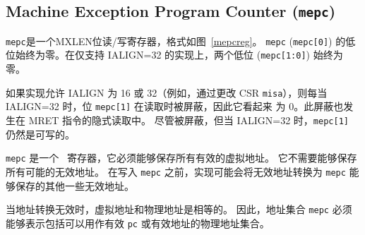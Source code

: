 \subsection{Machine Exception Program Counter ({\tt mepc})}

\iffalse
{\tt mepc} is an MXLEN-bit read/write register formatted as shown in
Figure~\ref{mepcreg}.  The low bit of {\tt mepc} ({\tt mepc[0]}) is
always zero.  On implementations that support only IALIGN=32, the two low bits
({\tt mepc[1:0]}) are always zero.

If an implementation allows IALIGN to be either 16 or 32 (by
changing CSR {\tt misa}, for example), then, whenever IALIGN=32, bit
{\tt mepc[1]} is masked on reads so that it appears to be 0.  This
masking occurs also for the implicit read by the MRET instruction.
Though masked, {\tt mepc[1]} remains writable when IALIGN=32.

{\tt mepc} is a \warl\ register that must be able to hold all valid
virtual addresses.  It need not be capable of holding all possible invalid
addresses.
Prior to writing {\tt mepc}, implementations may convert an invalid address
into some other invalid address that {\tt mepc} is capable of holding.
\fi

{\tt mepc}是一个MXLEN位读/写寄存器，格式如图~\ref{mepcreg}。 {\tt mepc} ({\tt mepc[0]}) 的低位始终为零。在仅支持 IALIGN=32 的实现上，两个低位 ({\tt mepc[1:0]}) 始终为零。

如果实现允许 IALIGN 为 16 或 32（例如，通过更改 CSR {\tt misa}），则每当 IALIGN=32 时，位 {\tt mepc[1]} 在读取时被屏蔽，因此它看起来 为 0。此屏蔽也发生在 MRET 指令的隐式读取中。 尽管被屏蔽，但当 IALIGN=32 时，{\tt mepc[1]} 仍然是可写的。

{\tt mepc} 是一个 \warl\ 寄存器，它必须能够保存所有有效的虚拟地址。 它不需要能够保存所有可能的无效地址。 在写入 {\tt mepc} 之前，实现可能会将无效地址转换为 {\tt mepc} 能够保存的其他一些无效地址。

\iffalse
\begin{commentary}
When address translation is not in effect, virtual addresses and physical
addresses are equal.
Hence, the set of addresses {\tt mepc} must be able to represent includes the
set of physical addresses that can be used as a valid {\tt pc} or effective
address.
\end{commentary}
\fi
\begin{commentary}
当地址转换无效时，虚拟地址和物理地址是相等的。 因此，地址集合 {\tt mepc} 必须能够表示包括可以用作有效 {\tt pc} 或有效地址的物理地址集合。
\end{commentary}

